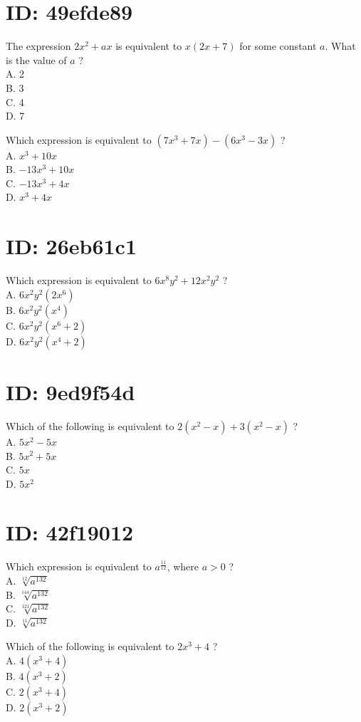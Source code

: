 \section*{ID: 49efde89}
The expression $2 x^{2}+a x$ is equivalent to $x(2 x+7)$ for some constant $a$. What is the value of $a$ ?\\
A. 2\\
B. 3\\
C. 4\\
D. 7

Which expression is equivalent to $\left(7 x^{3}+7 x\right)-\left(6 x^{3}-3 x\right)$ ?\\
A. $x^{3}+10 x$\\
B. $-13 x^{3}+10 x$\\
C. $-13 x^{3}+4 x$\\
D. $x^{3}+4 x$

\section*{ID: 26eb61c1}
Which expression is equivalent to $6 x^{8} y^{2}+12 x^{2} y^{2}$ ?\\
A. $6 x^{2} y^{2}\left(2 x^{6}\right)$\\
B. $6 x^{2} y^{2}\left(x^{4}\right)$\\
C. $6 x^{2} y^{2}\left(x^{6}+2\right)$\\
D. $6 x^{2} y^{2}\left(x^{4}+2\right)$

\section*{ID: 9ed9f54d}
Which of the following is equivalent to $2\left(x^{2}-x\right)+3\left(x^{2}-x\right)$ ?\\
A. $5 x^{2}-5 x$\\
B. $5 x^{2}+5 x$\\
C. $5 x$\\
D. $5 x^{2}$

\section*{ID: 42f19012}
Which expression is equivalent to $a^{\frac{11}{12}}$, where $a>0$ ?\\
A. $\sqrt[12]{a^{132}}$\\
B. $\sqrt[144]{a^{132}}$\\
C. $\sqrt[121]{a^{132}}$\\
D. $\sqrt[11]{a^{132}}$

Which of the following is equivalent to $2 x^{3}+4$ ?\\
A. $4\left(x^{3}+4\right)$\\
B. $4\left(x^{3}+2\right)$\\
C. $2\left(x^{3}+4\right)$\\
D. $2\left(x^{3}+2\right)$

